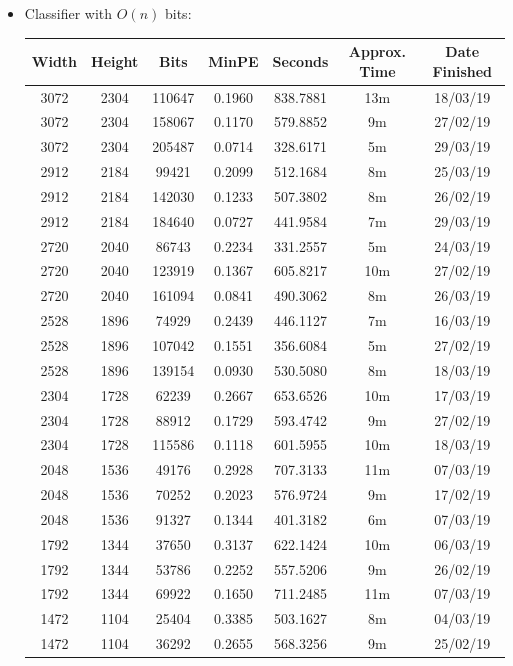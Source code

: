 \documentclass[11pt,a4paper]{report}
\begin{document}
\begin{itemize}
\newpage
\item Classifier with $O(n)$ bits:
  \begin{center}
  \begin{tabular}{ c c c | c | c c c }
  Width & Height & Bits & MinPE & Seconds & Approx. Time & Date Finished \\ \hline
  3072 & 2304 & 110647 & 0.1960 & 838.7881 & 13m & 18/03/19 \\
  3072 & 2304 & 158067 & 0.1170 & 579.8852 & 9m & 27/02/19 \\
  3072 & 2304 & 205487 & 0.0714 & 328.6171 & 5m & 29/03/19 \\
  2912 & 2184 & 99421 & 0.2099 & 512.1684 & 8m & 25/03/19 \\
  2912 & 2184 & 142030 & 0.1233 & 507.3802 & 8m & 26/02/19 \\
  2912 & 2184 & 184640 & 0.0727 & 441.9584 & 7m & 29/03/19 \\
  2720 & 2040 & 86743 & 0.2234 & 331.2557 & 5m & 24/03/19 \\
  2720 & 2040 & 123919 & 0.1367 & 605.8217 & 10m & 27/02/19 \\
  2720 & 2040 & 161094 & 0.0841 & 490.3062 & 8m & 26/03/19 \\
  2528 & 1896 & 74929 & 0.2439 & 446.1127 & 7m & 16/03/19 \\
  2528 & 1896 & 107042 & 0.1551 & 356.6084 & 5m & 27/02/19 \\
  2528 & 1896 & 139154 & 0.0930 & 530.5080 & 8m & 18/03/19 \\
  2304 & 1728 & 62239 & 0.2667 & 653.6526 & 10m & 17/03/19 \\
  2304 & 1728 & 88912 & 0.1729 & 593.4742 & 9m & 27/02/19 \\
  2304 & 1728 & 115586 & 0.1118 & 601.5955 & 10m & 18/03/19 \\
  2048 & 1536 & 49176 & 0.2928 & 707.3133 & 11m & 07/03/19 \\
  2048 & 1536 & 70252 & 0.2023 & 576.9724 & 9m & 17/02/19 \\
  2048 & 1536 & 91327 & 0.1344 & 401.3182 & 6m & 07/03/19 \\
  1792 & 1344 & 37650 & 0.3137 & 622.1424 & 10m & 06/03/19 \\
  1792 & 1344 & 53786 & 0.2252 & 557.5206 & 9m & 26/02/19 \\
  1792 & 1344 & 69922 & 0.1650 & 711.2485 & 11m & 07/03/19 \\
  1472 & 1104 & 25404 & 0.3385 & 503.1627 & 8m & 04/03/19 \\
  1472 & 1104 & 36292 & 0.2655 & 568.3256 & 9m & 25/02/19 \\

\end{tabular}
\end{center}
\end{itemize}
\end{document}
